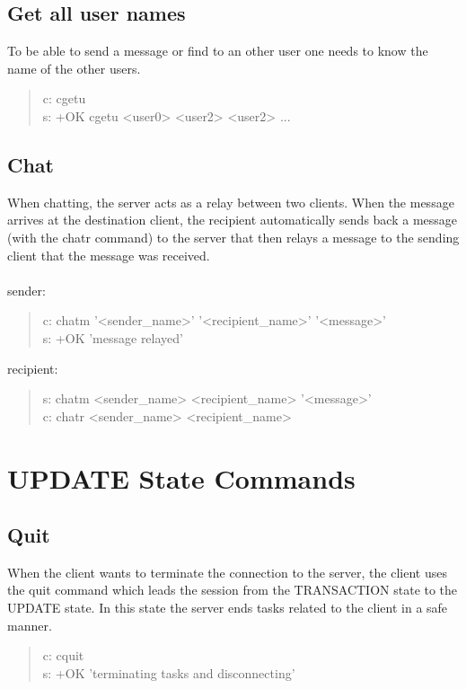 \documentclass[a4paper,11pt]{article}
\begin{document}

\subsection{Get all user names}
To be able to send a message or find to an other user one needs to know the name of the other users.
\begin{quote}
  c: cgetu\\
  s: +OK cgetu <user0> <user2> <user2> ...
\end{quote} 
\subsection{Chat}
When chatting, the server acts as a relay between two clients. When the message arrives at the destination client, the recipient automatically sends back a message (with the chatr command) to the server that then relays a message to the sending client that the message was received.\\\\
sender:
\begin{quote}
  c: chatm '<sender\_name>' '<recipient\_name>' '<message>'\\ %
  s: +OK 'message relayed'
\end{quote}
\noindent
recipient:
\begin{quote}
  s: chatm <sender\_name> <recipient\_name> '<message>'\\
  c: chatr <sender\_name> <recipient\_name>%
\end{quote}

\clearpage
\section{UPDATE State Commands}
\subsection{Quit}
When the client wants to terminate the connection to the server, the client uses the quit command which leads the session from the TRANSACTION state to the UPDATE state. In this state the server ends tasks related to the client in a safe manner.

\begin{quote}
  c: cquit\\
  s: +OK 'terminating tasks and disconnecting'
\end{quote}
\end{document}
